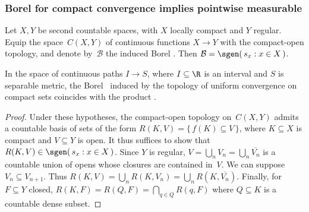 \subsubsection
	{Borel for compact convergence implies pointwise measurable}

\begin	{theorem}
Let $X,Y$ be second countable spaces,
with $X$ locally compact and $Y$ regular.
Equip the space~$C(X,Y)$ of continuous functions \( X \to Y \)
with the compact-open topology,
and denote by~$\mathcal B$ the induced Borel \salg.
Then \( \mathcal B = \sgen(\, s_x : x \in X \,) \).
\end	{theorem}

\begin	{corollary}
In the space of continuous paths \( I \to S \),
where \( I \subseteq \R \) is an interval and $S$ is separable metric,
the Borel \salg\ induced by the topology of uniform convergence on compact sets
coincides with the product \salg.
\end	{corollary}

\begin	{proof}
Under these hypotheses,
the compact-open topology on~$C(X,Y)$ admits a countable basis
of sets of the form \( R(K,V) = \{\, f(K) \subseteq V \,\} \),
where \( K \subseteq X \) is compact and \( V \subseteq Y \) is open.
It thus suffices to show that \( R(K,V) \in \sgen(\, s_x : x \in X \,) \).
Since $Y$ is regular,
\( V = \bigcup_n V_n = \bigcup_n \overline{V_n} \)
is a countable union of opens whose closures are contained in~$V$.
We can suppose \( V_n \subseteq V_{n+1} \).
Thus \( R(K,V) = \bigcup_n R(K,V_n) = \bigcup_n R(K,\overline{V_n}) \).
Finally, for \( F \subseteq Y \) closed,
\( R(K,F) = R(Q,F) = \bigcap_{q \in Q} R(q,F) \)
where \( Q \subseteq K \) is a countable dense subset.
\end	{proof}
